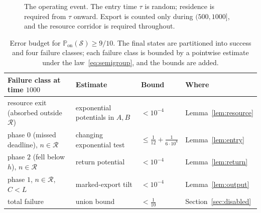 \documentclass[11pt,a4paper]{article}
\theoremstyle{plain}
\theoremstyle{definition}
\theoremstyle{remark}
\newcommand{\Prob}{\mathbb P}
\newcommand{\R}{\mathcal R}
\newcommand{\Son}{\mathcal S}
\begin{document}
\begin{figure}[b]
\centering
{}
\caption{The operating event. The entry time $\tau$ is random; residence is required from $\tau$ onward. Export is counted only during $(500,1000]$, and the resource corridor is required throughout.}\label{fig:timeline}
\end{figure}

\begin{table}[b]
\centering
\caption{Error budget for $\Prob_{\mathrm{on}}(\Son)\ge 9/10$. The final states are partitioned into success and four failure classes; each failure class is bounded by a pointwise estimate under the law~\eqref{eq:semigroup}, and the bounds are added.}\label{tab:budget}
\small
\begin{tabular}{llll}
\toprule
Failure class at time $1000$ & Estimate & Bound & Where\\
\midrule
resource exit (absorbed outside $\R$) & exponential potentials in $A,B$ & $<10^{-4}$ & Lemma~\ref{lem:resource}\\
phase $0$ (missed deadline), $n\in\R$ & changing exponential test & $\le\frac1{12}+\frac1{6\cdot10^8}$ & Lemma~\ref{lem:entry}\\
phase $2$ (fell below $h$), $n\in\R$ & return potential & $<10^{-4}$ & Lemma~\ref{lem:return}\\
phase $1$, $n\in\R$, $C<L$ & marked-export tilt & $<10^{-4}$ & Lemma~\ref{lem:output}\\
\midrule
total failure & union bound & $<\frac1{10}$ & Section~\ref{sec:disabled}\\
\bottomrule
\end{tabular}
\end{table}
\end{document}
